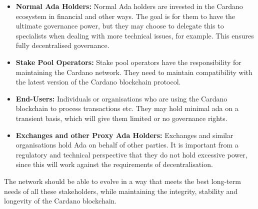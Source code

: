 \begin{itemize}
\item
  \textbf{Normal Ada Holders:}
  Normal Ada holders are invested in the Cardano ecosystem in financial and other ways.
  The goal is for them to have the ultimate governance power, but they may choose to delegate this to specialists when dealing with more technical issues, for example.
  This ensures fully decentralised governance.
  \item
  \textbf{Stake Pool Operators:}
  Stake pool operators have the responsibility for maintaining the Cardano network.  They need to maintain compatibility with the latest version of the Cardano blockchain protocol.
  \item
  \textbf{End-Users:}
  Individuals or organisations who are using the Cardano blockchain to process transactions etc.  They may hold minimal ada on a transient basis, which will give them limited or no governance rights.
  \item
  \textbf{Exchanges and other Proxy Ada Holders:}
  Exchanges and similar organisations hold Ada on behalf of other parties.  It is important from a regulatory and technical perspective that they do not hold excessive
  power, since this will work against the requirements of decentralisation.
\end{itemize}

The network should be able to evolve in a way that meets the best long-term needs of all these stakeholders, while maintaining the integrity, stability and longevity of
the Cardano blockchain.
